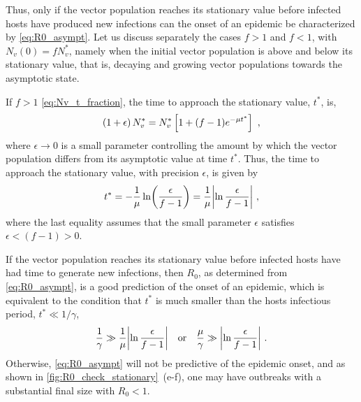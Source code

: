 Thus, only if the vector population reaches its stationary value before
infected hosts have produced new infections can the onset of an epidemic be
characterized by \cref{eq:R0_asympt}. Let us discuss separately the cases $f>1$
and $f<1$, with $N_v(0)=fN_v^*$, namely when the initial vector population is
above and below its stationary value, that is, decaying and growing vector
populations towards the asymptotic state.

If $f>1$ \cref{eq:Nv_t_fraction}, the time to approach the stationary
value, $t^*$, is,
\begin{equation}
    \left(1+\epsilon\right)N_v^*=N_v^*\left[1+(f-1)e^{-\mu t^*}\right] \ ,
\end{equation}
where $\epsilon\to 0$ is a small parameter controlling the amount by which
the vector population differs from its asymptotic value at time $t^*$. Thus,
the time to approach the stationary value, with precision $\epsilon$, is given
by
\begin{equation}
    t^*=-\frac{1}{\mu}\ln(\frac{\epsilon}{f-1})=
    \frac{1}{\mu}\abs{\ln{\frac{\epsilon}{f-1}}}
    \ ,
\end{equation}
where the last equality assumes that the small parameter $\epsilon$
satisfies $\epsilon<(f-1)>0$.

If the vector population reaches its stationary value before infected hosts
have had time to generate new infections, then $R_0$, as determined from
\cref{eq:R0_asympt}, is a good prediction of the onset of an epidemic, which
is equivalent to the condition that $t^*$ is much smaller than the hosts
infectious period, $t^*\ll1/\gamma$,
\begin{equation}\label{eq:timescales_condition}
    \frac{1}{\gamma} \gg \frac{1}{\mu}\abs{\ln{\frac{\epsilon}{f-1}}} \quad
    \textrm{or} \quad \frac{\mu}{\gamma}\gg\abs{\ln{\frac{\epsilon}{f-1}}}
    \ .
\end{equation}
Otherwise, \cref{eq:R0_asympt} will not be predictive of the epidemic
onset, and as shown in
\cref{fig:R0_check_stationary}~\textcolor{ref_color}{(e-f)}, one may have
outbreaks with a substantial final size with $R_0<1$.\\

